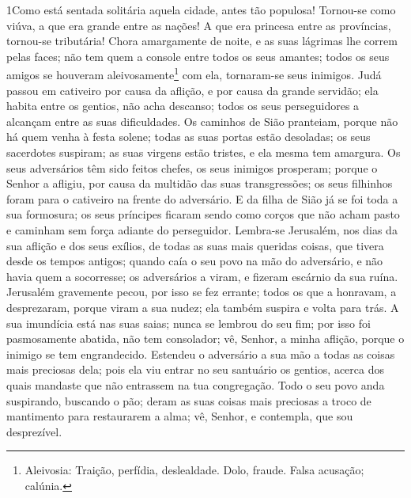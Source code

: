 
\lettrine{1} Como está sentada solitária aquela cidade, antes
tão populosa! Tornou-se como viúva, a que era grande entre as
nações! A que era princesa entre as províncias, tornou-se
tributária! Chora amargamente de noite, e as suas lágrimas lhe
correm pelas faces; não tem quem a console entre todos os seus
amantes; todos os seus amigos se houveram
aleivosamente\footnote{Aleivosia: Traição, perfídia, deslealdade.
Dolo, fraude.  Falsa acusação; calúnia.} com ela, tornaram-se seus
inimigos. Judá passou em cativeiro por causa da aflição, e por
causa da grande servidão; ela habita entre os gentios, não acha
descanso; todos os seus perseguidores a alcançam entre as suas
dificuldades. Os caminhos de Sião pranteiam, porque não há quem
venha à festa solene; todas as suas portas estão desoladas; os seus
sacerdotes suspiram; as suas virgens estão tristes, e ela mesma tem
amargura. Os seus adversários têm sido feitos chefes, os seus
inimigos prosperam; porque o Senhor  a afligiu, por causa da
multidão das suas transgressões; os seus filhinhos foram para o
cativeiro na frente do adversário. E da filha de Sião já se foi
toda a sua formosura; os seus príncipes ficaram sendo como corços
que não acham pasto e caminham sem força adiante do perseguidor.
Lembra-se Jerusalém, nos dias da sua aflição e dos seus exílios,
de todas as suas mais queridas coisas, que tivera desde os tempos
antigos; quando caía o seu povo na mão do adversário, e não havia
quem a socorresse; os adversários a viram, e fizeram escárnio da sua
ruína. Jerusalém gravemente pecou, por isso se fez errante;
todos os que a honravam, a desprezaram, porque viram a sua nudez;
ela também suspira e volta para trás. A sua imundícia está nas
suas saias; nunca se lembrou do seu fim; por isso foi pasmosamente
abatida, não tem consolador; vê, Senhor, a minha aflição, porque o
inimigo se tem engrandecido. Estendeu o adversário a sua mão
a todas as coisas mais preciosas dela; pois ela viu entrar no seu
santuário os gentios, acerca dos quais mandaste que não entrassem na
tua congregação. Todo o seu povo anda suspirando, buscando o
pão; deram as suas coisas mais preciosas a troco de mantimento para
restaurarem a alma; vê, Senhor, e contempla, que sou desprezível.

